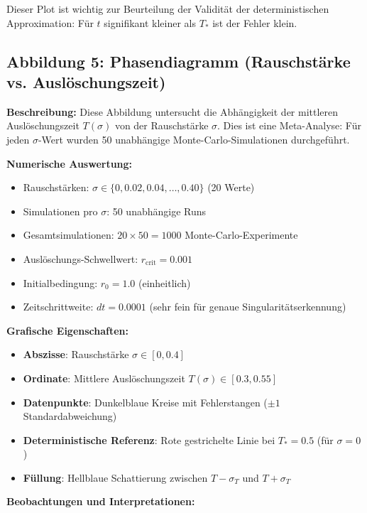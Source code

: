 \documentclass[a4paper,12pt]{article}
\theoremstyle{definition}
\begin{document}
Dieser Plot ist wichtig zur Beurteilung der Validität der deterministischen Approximation: Für $t$ signifikant kleiner als $T_*$ ist der Fehler klein.

\subsection{Abbildung 5: Phasendiagramm (Rauschstärke vs. Auslöschungszeit)}

\textbf{Beschreibung:} Diese Abbildung untersucht die Abhängigkeit der mittleren Auslöschungszeit $T(\sigma)$ von der Rauschstärke $\sigma$. Dies ist eine Meta-Analyse: Für jeden $\sigma$-Wert wurden 50 unabhängige Monte-Carlo-Simulationen durchgeführt.

\textbf{Numerische Auswertung:}
\begin{itemize}
	\item Rauschstärken: $\sigma \in \{0, 0.02, 0.04, \ldots, 0.40\}$ (20 Werte)
	\item Simulationen pro $\sigma$: 50 unabhängige Runs
	\item Gesamtsimulationen: $20 \times 50 = 1000$ Monte-Carlo-Experimente
	\item Auslöschungs-Schwellwert: $r_{\text{crit}} = 0.001$
	\item Initialbedingung: $r_0 = 1.0$ (einheitlich)
	\item Zeitschrittweite: $dt = 0.0001$ (sehr fein für genaue Singularitätserkennung)
\end{itemize}

\textbf{Grafische Eigenschaften:}
\begin{itemize}
	\item \textbf{Abszisse}: Rauschstärke $\sigma \in [0, 0.4]$
	\item \textbf{Ordinate}: Mittlere Auslöschungszeit $T(\sigma) \in [0.3, 0.55]$
	\item \textbf{Datenpunkte}: Dunkelblaue Kreise mit Fehlerstangen ($\pm 1$ Standardabweichung)
	\item \textbf{Deterministische Referenz}: Rote gestrichelte Linie bei $T_* = 0.5$ (für $\sigma = 0$)
	\item \textbf{Füllung}: Hellblaue Schattierung zwischen $T - \sigma_T$ und $T + \sigma_T$
\end{itemize}

\textbf{Beobachtungen und Interpretationen:}
\end{document}
